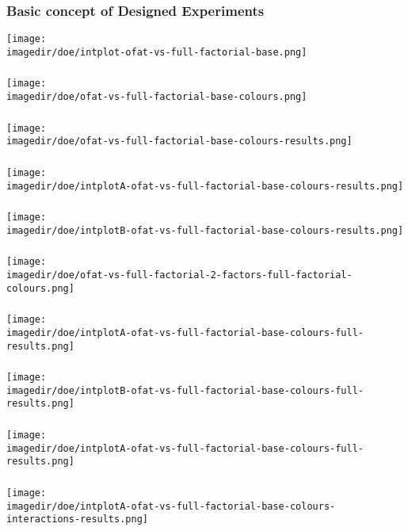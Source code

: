 \documentclass[handout,11pt,aspectratio=169,mathserif]{beamer}
\begin{document}
\begin{frame}\frametitle{Basic concept of Designed Experiments}
	\centerline{\texttt{[image: \\imagedir/doe/intplot-ofat-vs-full-factorial-base.png]}}
\end{frame}
\begin{frame}\frametitle{}
	\centerline{\texttt{[image: \\imagedir/doe/ofat-vs-full-factorial-base-colours.png]}}
\end{frame}
\begin{frame}\frametitle{}
	\centerline{\texttt{[image: \\imagedir/doe/ofat-vs-full-factorial-base-colours-results.png]}}
\end{frame}
\begin{frame}\frametitle{}
	\centerline{\texttt{[image: \\imagedir/doe/intplotA-ofat-vs-full-factorial-base-colours-results.png]}}
\end{frame}
\begin{frame}\frametitle{}
	\centerline{\texttt{[image: \\imagedir/doe/intplotB-ofat-vs-full-factorial-base-colours-results.png]}}
\end{frame}
\begin{frame}\frametitle{}
	\centerline{\texttt{[image: \\imagedir/doe/ofat-vs-full-factorial-2-factors-full-factorial-colours.png]}}
\end{frame}
\begin{frame}\frametitle{}
	\centerline{\texttt{[image: \\imagedir/doe/intplotA-ofat-vs-full-factorial-base-colours-full-results.png]}}
\end{frame}
\begin{frame}\frametitle{}
	\centerline{\texttt{[image: \\imagedir/doe/intplotB-ofat-vs-full-factorial-base-colours-full-results.png]}}
\end{frame}
\begin{frame}\frametitle{}
	\centerline{\texttt{[image: \\imagedir/doe/intplotA-ofat-vs-full-factorial-base-colours-full-results.png]}}
\end{frame}
\begin{frame}\frametitle{}
	\centerline{\texttt{[image: \\imagedir/doe/intplotA-ofat-vs-full-factorial-base-colours-interactions-results.png]}}
\end{frame}
\end{document}
